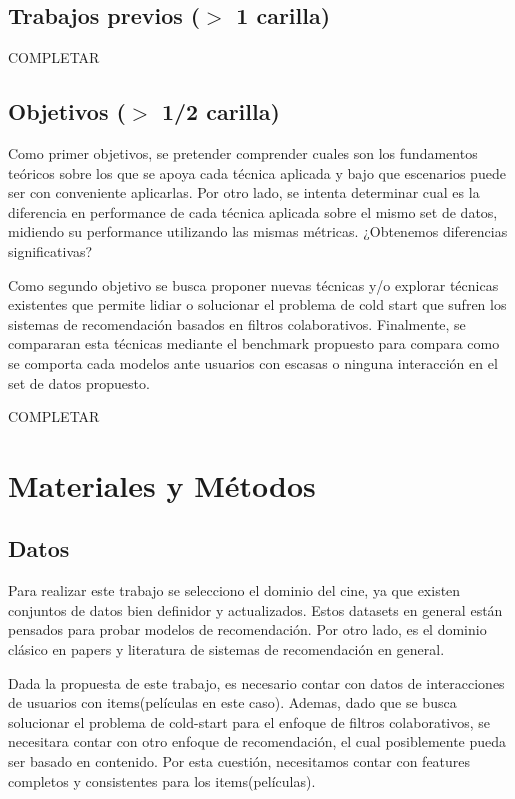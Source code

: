\documentclass[11pt,a4paper,twoside]{thesis}
\begin{document}
\section{Trabajos previos ($>$ 1 carilla)}

COMPLETAR

\section{Objetivos ($>$ 1/2 carilla)}

Como primer objetivos, se pretender comprender cuales son los fundamentos teóricos sobre los que se apoya cada técnica aplicada y bajo que escenarios puede ser con conveniente aplicarlas. Por otro lado, se intenta determinar cual es la diferencia en performance de cada técnica aplicada sobre el mismo set de datos, midiendo su performance utilizando las mismas métricas. ¿Obtenemos diferencias significativas?

Como segundo objetivo se busca proponer nuevas técnicas y/o explorar técnicas existentes que permite lidiar o solucionar el problema de cold start que sufren los sistemas de recomendación basados en filtros colaborativos. Finalmente, se compararan esta técnicas mediante el benchmark propuesto para compara como se comporta cada modelos ante usuarios con escasas o ninguna interacción en el set de datos propuesto.

COMPLETAR

\chapter{Materiales y Métodos}

\section{Datos} 

Para realizar este trabajo se selecciono el dominio del cine, ya que existen conjuntos de datos bien definidor y actualizados. 
Estos datasets en general están pensados para probar modelos de recomendación. Por otro lado, es el dominio clásico en papers 
y literatura de sistemas de recomendación en general.

Dada la propuesta de este trabajo, es necesario contar con datos de interacciones de usuarios con items(películas en este caso). 
Ademas, dado que se busca solucionar el problema de cold-start para el enfoque de filtros colaborativos, se necesitara contar 
con otro enfoque de recomendación, el cual posiblemente pueda ser basado en contenido. Por esta cuestión, necesitamos contar 
con features completos y consistentes para los items(películas).
\end{document}
